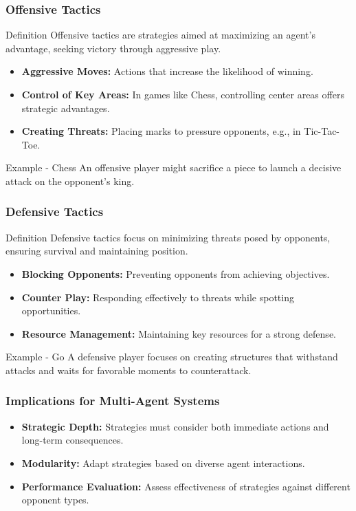 \documentclass[aspectratio=169]{beamer}
\begin{document}
\begin{frame}[fragile]
    \frametitle{Offensive Tactics}
    \begin{block}{Definition}
        Offensive tactics are strategies aimed at maximizing an agent's advantage, seeking victory through aggressive play.
    \end{block}
    \begin{itemize}
        \item \textbf{Aggressive Moves:} Actions that increase the likelihood of winning.
        \item \textbf{Control of Key Areas:} In games like Chess, controlling center areas offers strategic advantages.
        \item \textbf{Creating Threats:} Placing marks to pressure opponents, e.g., in Tic-Tac-Toe.
    \end{itemize}
    \begin{block}{Example - Chess}
        An offensive player might sacrifice a piece to launch a decisive attack on the opponent's king.
    \end{block}
\end{frame}

\begin{frame}[fragile]
    \frametitle{Defensive Tactics}
    \begin{block}{Definition}
        Defensive tactics focus on minimizing threats posed by opponents, ensuring survival and maintaining position.
    \end{block}
    \begin{itemize}
        \item \textbf{Blocking Opponents:} Preventing opponents from achieving objectives.
        \item \textbf{Counter Play:} Responding effectively to threats while spotting opportunities.
        \item \textbf{Resource Management:} Maintaining key resources for a strong defense.
    \end{itemize}
    \begin{block}{Example - Go}
        A defensive player focuses on creating structures that withstand attacks and waits for favorable moments to counterattack.
    \end{block}
\end{frame}

\begin{frame}[fragile]
    \frametitle{Implications for Multi-Agent Systems}
    \begin{itemize}
        \item \textbf{Strategic Depth:} Strategies must consider both immediate actions and long-term consequences.
        \item \textbf{Modularity:} Adapt strategies based on diverse agent interactions.
        \item \textbf{Performance Evaluation:} Assess effectiveness of strategies against different opponent types.
    \end{itemize}
\end{frame}
\end{document}
